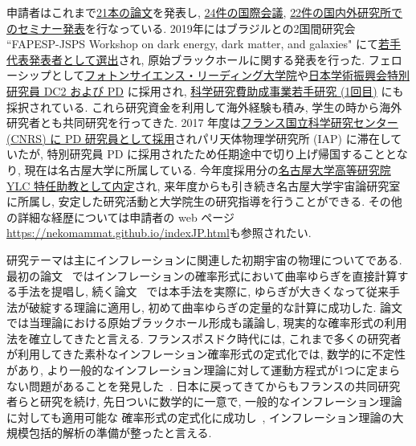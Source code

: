 \documentclass[11pt,a4paper,uplatex,dvipdfmx]{ujarticle} 		%
\newcommand{\研究課題名}{確率解析・原始ブラックホール・重力波観測から迫るインフレーション}
\newcommand{\研究機関名}{名古屋大学}
\newcommand{\研究代表者氏名}{多田祐一郎}
\newcommand{\研究期間の最終元号年度}{6}  %
\begin{document}
\noindent
申請者はこれまで\ul{21本の論文}を発表し, \ul{24件の国際会議}, \ul{22件の国内外研究所でのセミナー発表}を行なっている.
2019年にはブラジルとの2国間研究会 ``FAPESP-JSPS Workshop on dark energy, dark matter, and galaxies"
にて\ul{若手代表発表者として選出}され, 原始ブラックホールに関する発表を行った.
フェローシップとして\ul{フォトンサイエンス・リーディング大学院}や\ul{日本学術振興会特別研究員 DC2 および PD} に採用され,
\ul{科学研究費助成事業若手研究 (1回目)} にも採択されている.
これら研究資金を利用して海外経験も積み, 学生の時から海外研究者とも共同研究を行ってきた. 
2017 年度は\ul{フランス国立科学研究センター (CNRS) に PD 研究員として採用}されパリ天体物理学研究所 (IAP) に滞在していたが, 
特別研究員 PD に採用されたため任期途中で切り上げ帰国することとなり, 現在は名古屋大学に所属している.
今年度採用分の\ul{名古屋大学高等研究院 YLC 特任助教として内定}され, 来年度からも引き続き名古屋大学宇宙論研究室に所属し,
安定した研究活動と大学院生の研究指導を行うことができる.
その他の詳細な経歴については申請者の web ページ \url{https://nekomammat.github.io/indexJP.html}も参照されたい.

研究テーマは主にインフレーションに関連した初期宇宙の物理についてである.
最初の論文~\cite{Fujita:2013cna} ではインフレーションの確率形式において曲率ゆらぎを直接計算する手法を提唱し,
続く論文~\cite{Fujita:2014tja} では本手法を実際に, ゆらぎが大きくなって従来手法が破綻する理論に適用し, 初めて曲率ゆらぎの定量的な計算に成功した.
論文~\cite{Kawasaki:2015ppx} では当理論における原始ブラックホール形成も議論し, 現実的な確率形式の利用法を確立してきたと言える.
フランスポスドク時代には, これまで多くの研究者が利用してきた素朴なインフレーション確率形式の定式化では, 数学的に不定性があり,
より一般的なインフレーション理論に対して運動方程式が1つに定まらない問題があることを発見した~\cite{Pinol:2018euk}.
日本に戻ってきてからもフランスの共同研究者らと研究を続け, 先日ついに数学的に一意で, 一般的なインフレーション理論に対しても適用可能な
確率形式の定式化に成功し~\cite{Pinol:2020cdp}, インフレーション理論の大規模包括的解析の準備が整ったと言える.
\end{document}
